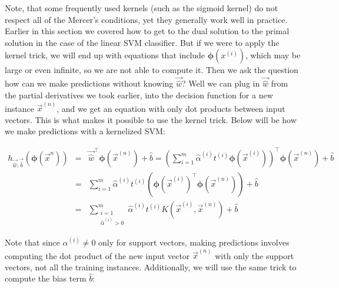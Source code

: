 \noindent
Note, that some frequently used kernels (such as the sigmoid kernel) do not respect all of the Mercer's conditions,
yet they generally work well in practice. \\

\noindent
Earlier in this section we covered how to get to the dual solution to the primal solution in the case of the 
linear SVM classifier. But if we were to apply the kernel trick, we will end up with equations that include
$\boldsymbol{\phi}(x^{(i)})$, which may be large or even infinite, so we are not able to compute it. Then we 
ask the question how can we make predictions without knowing $\vec{\hat{w}}$? Well we can plug in $\vec{\hat{w}}$
from the partial derivatives we took earlier, into the decision function for a new instance $\vec{x}^{(n)}$, and
we get an equation with only dot products between input vectors. This is what makes it possible to use the kernel
trick. Below will be how we make predictions with a kernelized SVM:

\begin{eqnarray}
h_{\vec{\hat{w}}, \vec{\hat{b}}}\left(\boldsymbol{\phi}(\vec{x}^{n})\right) &=& \vec{\hat{w}}^{\intercal}\boldsymbol{\phi}\left(\vec{x}^{(n)}\right) + \hat{b} =\left(\sum_{i=1}^{m} \hat{\alpha}^{(i)}t^{(i)}\boldsymbol{\phi}\left(\vec{x}^{(i)}\right)\right)^{\intercal}\boldsymbol{\phi}\left(\vec{x}^{(n)}\right) + \hat{b} \nonumber \\
                                                                 &=& \sum_{i=1}^{m} \hat{\alpha}^{(i)}t^{(i)} \left(\boldsymbol{\phi}\left(\vec{x}^{(i)}\right)^{\intercal}\boldsymbol{\phi}\left(\vec{x}^{(n)}\right)\right) + \hat{b} \nonumber \\
                                                                 &=& \sum_{\substack{i=1 \\ \hat{\alpha}^{(i)} > 0}}^{m} \hat{\alpha}^{(i)} t^{(i)} K\left(\vec{x}^{(i)}, \vec{x}^{(n)}\right) + \hat{b} \nonumber
\end{eqnarray}

\noindent
Note that since $\alpha^{(i)} \neq 0$ only for support vectors, making predictions involves computing the dot
product of the new input vector $\vec{x}^{(n)}$ with only the support vectors, not all the training instances.
Additionally, we will use the same trick to compute the bias term $\hat{b}$:

